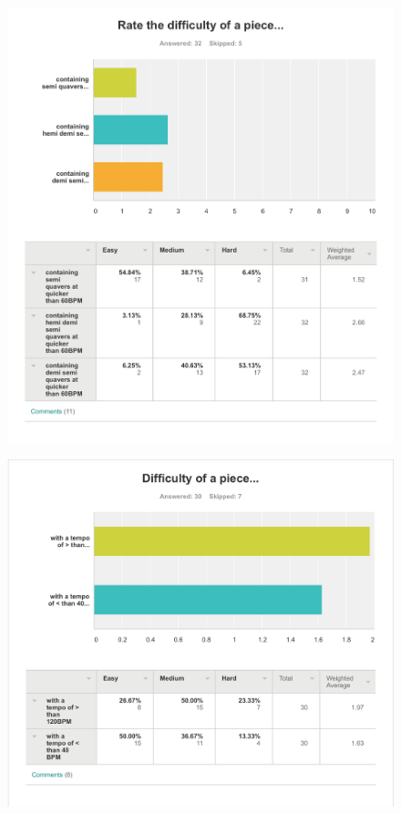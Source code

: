 \begin{appendices}
\begin{figure}[H]
\centering
\includegraphics[width=\textwidth]{survey_results/rhythm}
\end{figure}

\begin{figure}[H]
\centering
\includegraphics[width=\textwidth]{survey_results/tempo}
\end{figure}


\end{appendices}
